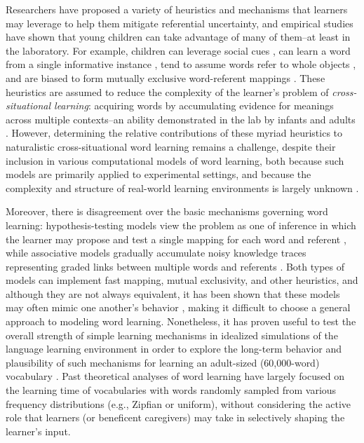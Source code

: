 \documentclass[a4paper,natbib,man]{apa6}
\begin{document}
Researchers have proposed a variety of heuristics and mechanisms that learners may leverage to help them mitigate referential uncertainty, and empirical studies have shown that young children can take advantage of many of them--at least in the laboratory. 
For example, children can leverage social cues \citep{HirshPasek:2000}, can learn a word from a single informative instance \citep[i.e., {\em fast-map};][]{Carey:1978,Spiegel:2011}, tend to assume words refer to whole objects \citep{Macnamara:1972}, and are biased to form mutually exclusive word-referent mappings \citep{Merriman:1989}. 
These heuristics are assumed to reduce the complexity of the learner's problem of {\it cross-situational learning}: acquiring words by accumulating evidence for meanings across multiple contexts--an ability demonstrated in the lab by infants and adults \citep{Smith:2008vg,Yu:2007}. 
However, determining the relative contributions of these myriad heuristics to naturalistic cross-situational word learning remains a challenge, despite their inclusion in various computational models of word learning, both because such models are primarily applied to experimental settings, and because the complexity and structure of real-world learning environments is largely unknown \citep[though see][]{Smith:2018,Suanda:2018,Clerkin:2017}.

Moreover, there is disagreement over the basic mechanisms governing word learning: hypothesis-testing models view the problem as one of inference in which the learner may propose and test a single mapping for each word and referent \citep[e.g.,][]{Trueswell:2013}, while associative models gradually accumulate noisy knowledge traces representing graded links between multiple words and referents \citep[e.g.,][]{McMurray:2012,Kachergis:2012gi}.
Both types of models can implement fast mapping, mutual exclusivity, and other heuristics, and although they are not always equivalent, it has been shown that these models may often mimic one another's behavior \citep{Yu:2012hyp}, making it difficult to choose a general approach to modeling word learning. 
Nonetheless, it has proven useful to test the overall strength of simple learning mechanisms in idealized simulations of the language learning environment in order to explore the long-term behavior and plausibility of such mechanisms for learning an adult-sized (60,000-word) vocabulary \citep{Blythe:2010,Vogt:2012,Blythe:2016}.
Past theoretical analyses of word learning have largely focused on the learning time of vocabularies with words randomly sampled from various frequency distributions (e.g., Zipfian or uniform), without considering the active role that learners (or beneficent caregivers) may take in selectively shaping the learner's input.
\end{document}
